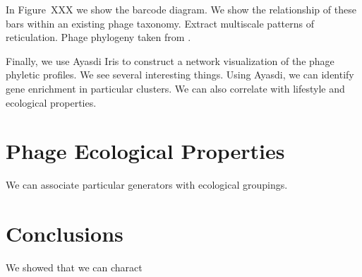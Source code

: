 In Figure~XXX we show the barcode diagram.
We show the relationship of these bars within an existing phage taxonomy.
Extract multiscale patterns of reticulation.
Phage phylogeny taken from \cite{Glazko:2007dc}.

Finally, we use Ayasdi Iris to construct a network visualization of the phage phyletic profiles.
We see several interesting things.
Using Ayasdi, we can identify gene enrichment in particular clusters.
We can also correlate with lifestyle and ecological properties.

\section{Phage Ecological Properties}
\label{phage:sec:ecological_properties}

We can associate particular generators with ecological groupings.

\section{Conclusions}
\label{phage:sec:conclusions}

We showed that we can charact